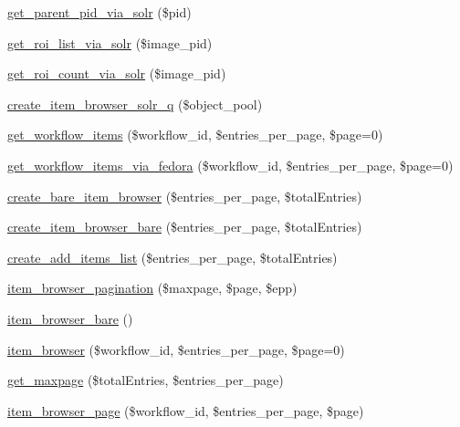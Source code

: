 \begin{DoxyCompactItemize}
\item 
\hyperlink{workspace_8functions_8php_a2d7495d2abde6025c8af9db740902617}{get\_\-parent\_\-pid\_\-via\_\-solr} (\$pid)
\item 
\hyperlink{workspace_8functions_8php_a9bd79e7f1ee258fbc21969a12ee694c7}{get\_\-roi\_\-list\_\-via\_\-solr} (\$image\_\-pid)
\item 
\hyperlink{workspace_8functions_8php_a85b2bb8ebd4c8259adf1656c4f80b78a}{get\_\-roi\_\-count\_\-via\_\-solr} (\$image\_\-pid)
\item 
\hyperlink{workspace_8functions_8php_a35996c2bae8f203dab6b8cf5c5d3d155}{create\_\-item\_\-browser\_\-solr\_\-q} (\$object\_\-pool)
\item 
\hyperlink{workspace_8functions_8php_a5968cffd7c081d1152d321d4649e50d0}{get\_\-workflow\_\-items} (\$workflow\_\-id, \$entries\_\-per\_\-page, \$page=0)
\item 
\hyperlink{workspace_8functions_8php_a26df2e0d7c88df97768104e8be693005}{get\_\-workflow\_\-items\_\-via\_\-fedora} (\$workflow\_\-id, \$entries\_\-per\_\-page, \$page=0)
\item 
\hyperlink{workspace_8functions_8php_a7874eb316c84c820083eff9624657454}{create\_\-bare\_\-item\_\-browser} (\$entries\_\-per\_\-page, \$totalEntries)
\item 
\hyperlink{workspace_8functions_8php_ab7998174e221c7580b36db79ea435337}{create\_\-item\_\-browser\_\-bare} (\$entries\_\-per\_\-page, \$totalEntries)
\item 
\hyperlink{workspace_8functions_8php_abde27a8b7ead7d9a71ee23d285adf8f0}{create\_\-add\_\-items\_\-list} (\$entries\_\-per\_\-page, \$totalEntries)
\item 
\hyperlink{workspace_8functions_8php_abf61ef625c1650262e4248b4dbd73f2d}{item\_\-browser\_\-pagination} (\$maxpage, \$page, \$epp)
\item 
\hyperlink{workspace_8functions_8php_a3908b51f395452a03e910b8d0654ac70}{item\_\-browser\_\-bare} ()
\item 
\hyperlink{workspace_8functions_8php_a7e08d9faca4b3131d6930a60784f3ef8}{item\_\-browser} (\$workflow\_\-id, \$entries\_\-per\_\-page, \$page=0)
\item 
\hyperlink{workspace_8functions_8php_a03e1829822f4fa388b45fc091af30f02}{get\_\-maxpage} (\$totalEntries, \$entries\_\-per\_\-page)
\item 
\hyperlink{workspace_8functions_8php_ad6f4b98127b10422b842a1c921ec5e23}{item\_\-browser\_\-page} (\$workflow\_\-id, \$entries\_\-per\_\-page, \$page)
\item 

\end{DoxyCompactItemize}
